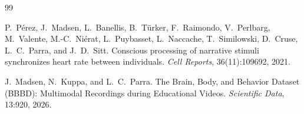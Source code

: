 \documentclass[pdflatex,sn-mathphys-num]{sn-jnl}%
\theoremstyle{thmstyleone}%
\theoremstyle{thmstyletwo}%
\theoremstyle{thmstylethree}%
\begin{document}
\begin{thebibliography}{99}

P.~P{\'e}rez, J.~Madsen, L.~Banellis, B.~T{\"u}rker, F.~Raimondo, V.~Perlbarg, M.~Valente, M.-C.~Ni{\'e}rat, L.~Puybasset, L.~Naccache, T.~Similowski, D.~Cruse, L.~C.~Parra, and J.~D.~Sitt.
\newblock Conscious processing of narrative stimuli synchronizes heart rate between individuals.
\newblock \emph{Cell Reports}, 36(11):109692, 2021.

J.~Madsen, N.~Kuppa, and L.~C.~Parra.
\newblock The Brain, Body, and Behavior Dataset (BBBD): Multimodal Recordings during Educational Videos.
\newblock \emph{Scientific Data}, 13:920, 2026.

\end{thebibliography}
\end{document}
